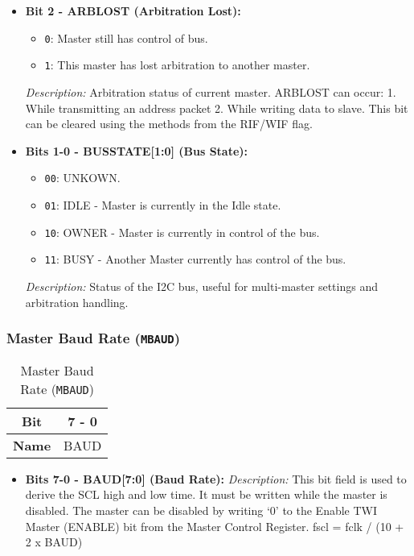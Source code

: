 \begin{itemize}
      \item \textbf{Bit 2 - ARBLOST (Arbitration Lost):} 
      \begin{itemize}
          \item \texttt{0}: Master still has control of bus.
          \item \texttt{1}: This master has lost arbitration to another master.
      \end{itemize}
      \textit{Description:} Arbitration status of current master. ARBLOST can occur: 1. While transmitting an address packet 2. While writing data to slave. This bit can be cleared using the methods from the RIF/WIF flag.

      \item \textbf{Bits 1-0 - BUSSTATE[1:0] (Bus State):} 
      \begin{itemize}
          \item \texttt{00}: UNKOWN.
          \item \texttt{01}: IDLE - Master is currently in the Idle state.
          \item \texttt{10}: OWNER - Master is currently in control of the bus.
          \item \texttt{11}: BUSY - Another Master currently has control of the bus.
      \end{itemize}
      \textit{Description:} Status of the I2C bus, useful for multi-master settings and arbitration handling.
  \end{itemize}
  
  \subsubsection{Master Baud Rate (\texttt{MBAUD})}
  \label{sec:mbaud}
  
  \begin{table}[H]
      \centering
      \caption{Master Baud Rate (\texttt{MBAUD})}
      \begin{tabular}{@{}cc@{}}
          \toprule
          \textbf{Bit} & 7 - 0 \\ \midrule
          \textbf{Name} & BAUD \\ \bottomrule
      \end{tabular}
      \label{tab:mbaud}
  \end{table}
  
  \begin{itemize}
      
      \item \textbf{Bits 7-0 - BAUD[7:0] (Baud Rate):} 
      \textit{Description:} This bit field is used to derive the SCL high and low time. It must be written while the master is disabled. The master
      can be disabled by writing ‘0’ to the Enable TWI Master (ENABLE) bit from the Master Control Register. fscl = fclk / (10 + 2 x BAUD)
  \end{itemize}

